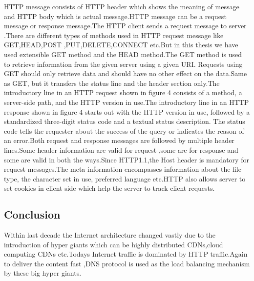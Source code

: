 HTTP message consists of HTTP header which shows the meaning of message
and HTTP body which is actual message.HTTP message can be a request message
or response message.The HTTP client sends a request message to server .There are
different types of methods used in HTTP request message like GET,HEAD,POST
,PUT,DELETE,CONNECT etc.But in this thesis we have used extensible GET
method and the HEAD method.The GET method is used to retrieve information
from the given server using a given URI. Requests using GET should only
retrieve data and should have no other effect on the data.Same as GET, but
it transfers the status line and the header section only.The introductory line in
an HTTP request shown in figure 4 consists of a method, a server-side path, and the
HTTP version in use.The introductory line in an HTTP response shown in figure 4
starts out with the HTTP version in use, followed by a standardized three-digit
status code and a textual status description. The status code tells the requester
about the success of the query or indicates the reason of an error.Both request and response messages are followed by multiple header lines.Some header information are valid for request
,some are for response and some are valid in both the ways.Since HTTP1.1,the
Host header is mandatory for request messages.The meta information encompasses information about the file type, the character set in use, preferred language etc.HTTP also allows server to set cookies in client side which help the server to track client requests.

\subsection{Conclusion}

Within last decade the Internet architecture changed vastly due to the introduction of hyper giants which can be highly distributed CDNs,cloud computing
CDNs etc.Todays Internet traffic is dominated by HTTP traffic.Again to deliver
the content fast ,DNS protocol is used as the load balancing mechanism by these
big hyper giants.
